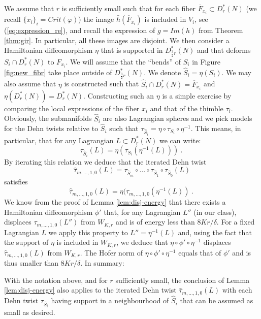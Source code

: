 We assume that $r$ is sufficiently small such that for each 
fiber $\overline{F}_{x_{i}}\subset D^{\ast}_{r}(N)$ (we recall $\{x_{i}\}_{i}=Crit(\varphi)$)  the image $\bar{h}(\overline{F}_{x_{i}})$ is included in $V_{i}$, see 
(\ref{eq:expression_re}),  and recall the expression of $g= Im(h)$ from Theorem \ref{thm:gir}. In particular, all these images are disjoint. We then 
consider a Hamiltonian diffeomorphism $\eta$ that is supported in $D^{\ast}_{\frac{3}{2}r}(N)$ and that deforms $S_{i}\cap D^{\ast}_{r}(N)$ to $F_{x_{i}}$. We will 
assume that the ``bends'' of $S_{i}$ in Figure \ref{fig:new_fibr} take place 
outside of $D^{\ast}_{\frac{3}{2}r}(N)$. We denote $\hat{S}_{i}=\eta(S_{i})$. We may also assume that $\eta$ is constructed such that $\hat{S}_{i}\cap D^{\ast}_{r}(N) = \overline{F}_{x_{i}}$ and $\eta(D^{\ast}_{r}(N))= D^{\ast}_{r}(N)$. Constructing such an $\eta$ is a simple exercise  by comparing the local expressions of the fiber $x_{i}$ and that of the thimble
$\tau_{i}$. Obviously, the submanifolds $\hat{S}_{i}$ are also Lagrangian spheres and we pick models for the Dehn twists relative to $\hat{S}_{i}$ such 
that $\tau_{\hat{S}_{i}}=\eta \circ \tau_{S_{i}}\circ \eta^{-1}$. This means, in particular,
that for any Lagrangian $L\subset D^{\ast}_{r}(N)$ we can write: 
$$\tau_{\hat{S}_{i}}(L)= \eta ( \tau_{S_{i}} (\eta^{-1}(L)))~.~$$
By iterating this relation we deduce that the iterated Dehn twist
$$\hat{\tau}_{m,\ldots, 1,0} (L) = \tau_{\hat{S}_{m}}\circ \ldots  \circ \tau_{\hat{S}_{1}}\circ\tau_{\hat{S}_{0}} (L)$$
satisfies
$$\hat{\tau}_{m,\ldots, 1,0} (L) =\eta( \tau_{m,\ldots,1,0} (\eta^{-1}(L))~.~$$
We know from the proof of Lemma \ref{lem:disj-energy} that there exists a Hamiltonian diffeomorphism $\phi'$ that, for any Lagrangian $L''$ (in our class), displaces $\tau_{m,\ldots,1,0}(L'')$ from $W_{K,r}$ and is of energy less than $8Kr/\delta$.  For a fixed Lagrangian $L$ we apply this property to $L''=\eta^{-1}(L)$  and, using the fact that the support of $\eta$ is included in $W_{K,r}$, we deduce that $\eta \circ \phi'\circ \eta^{-1}$ displaces $\hat{\tau}_{m,\ldots, 1, 0}(L)$ from  $W_{K,r}$. The Hofer norm of $\eta\circ \phi'\circ \eta^{-1}$ equals that of $\phi'$ and is thus smaller than $8Kr/\delta$.
In summary:
\begin{prop}\label{lem:disj_fibers} With the notation above, and for $r$ sufficiently small,  the conclusion  of Lemma \ref{lem:disj-energy} also applies to the iterated Dehn twist $\hat{\tau}_{m,\ldots, 1,0}(L)$ with each Dehn twist $\tau_{\hat{S}_{i}}$ having support in a neighbourhood of $\hat{S}_{i}$ that can be assumed as small as desired. \end{prop} 


